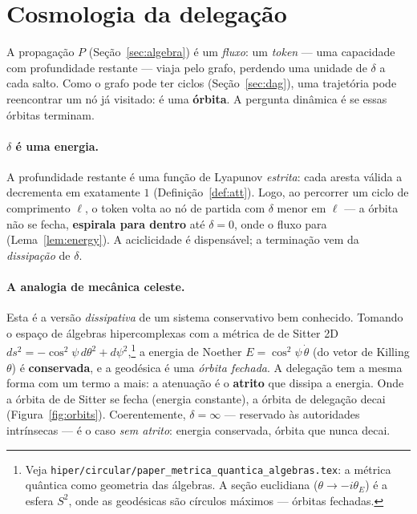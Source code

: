 \documentclass[11pt,a4paper]{article}
\theoremstyle{definition}
\newcommand{\dep}{\delta}
\begin{document}
\section{Cosmologia da delegação}\label{sec:orbits}

A propagação $P$ (Seção~\ref{sec:algebra}) é um \emph{fluxo}: um \emph{token}
--- uma capacidade com profundidade restante --- viaja pelo grafo, perdendo
uma unidade de $\dep$ a cada salto. Como o grafo pode ter ciclos
(Seção~\ref{sec:dag}), uma trajetória pode reencontrar um nó já visitado: é
uma \textbf{órbita}. A pergunta dinâmica é se essas órbitas terminam.

\paragraph{$\dep$ é uma energia.} A profundidade restante é uma função de
Lyapunov \emph{estrita}: cada aresta válida a decrementa em exatamente $1$
(Definição~\ref{def:att}). Logo, ao percorrer um ciclo de comprimento $\ell$,
o token volta ao nó de partida com $\dep$ menor em $\ell$ --- a órbita não se
fecha, \textbf{espirala para dentro} até $\dep=0$, onde o fluxo para
(Lema~\ref{lem:energy}). A aciclicidade é dispensável; a terminação vem da
\emph{dissipação} de $\dep$.

\paragraph{A analogia de mecânica celeste.} Esta é a versão \emph{dissipativa}
de um sistema conservativo bem conhecido. Tomando o espaço de álgebras
hipercomplexas com a métrica de de Sitter 2D
$ds^2=-\cos^2\psi\,d\theta^2+d\psi^2$,\footnote{Veja
\texttt{hiper/circular/paper\_metrica\_quantica\_algebras.tex}: a métrica
quântica como geometria das álgebras. A seção euclidiana ($\theta\to-i\theta_E$)
é a esfera $S^2$, onde as geodésicas são círculos máximos --- órbitas
fechadas.} a energia de Noether $E=\cos^2\psi\,\dot\theta$ (do vetor de Killing
$\theta$) é \textbf{conservada}, e a geodésica é uma \emph{órbita fechada}. A
delegação tem a mesma forma com um termo a mais: a atenuação é o
\textbf{atrito} que dissipa a energia. Onde a órbita de de Sitter se fecha
(energia constante), a órbita de delegação decai (Figura~\ref{fig:orbits}).
Coerentemente, $\dep=\infty$ --- reservado às autoridades intrínsecas --- é o
caso \emph{sem atrito}: energia conservada, órbita que nunca decai.
\end{document}
